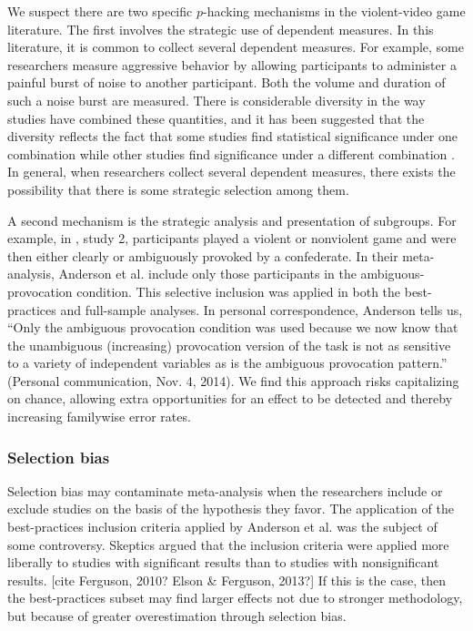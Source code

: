 \documentclass[man]{apa6}
\begin{document}
We suspect there are two specific $p$-hacking mechanisms in the violent-video game literature.  The first involves the strategic use of dependent measures.  In this literature, it is common to collect several dependent measures.  For example, some researchers measure aggressive behavior by allowing participants to administer a painful burst of noise to another participant. Both the volume and duration of such a noise burst are measured.  There is considerable diversity in the way studies have combined these quantities, and it has been suggested that the diversity reflects the fact that some studies find statistical significance under one combination while other studies find significance under a different combination \citep{Elson:etal:2014}.  In general, when researchers collect several dependent measures, there exists the possibility that there is some strategic selection among them.  

A second mechanism is the strategic analysis and presentation of subgroups. For example, in \citet{Anderson:etal:2004}, study 2, participants played a violent or nonviolent game and were then either clearly or ambiguously provoked by a confederate. In their meta-analysis, Anderson et al. include only those participants in the ambiguous-provocation condition. This selective inclusion was applied in both the best-practices and full-sample analyses. In personal correspondence, Anderson tells us, ``Only the ambiguous provocation condition was used because we now know that the unambiguous (increasing) provocation version of the task is not as sensitive to a variety of independent variables as is the ambiguous provocation pattern.'' (Personal communication, Nov. 4, 2014). 
We find this approach risks capitalizing on chance, allowing extra opportunities for an effect to be detected and thereby increasing familywise error rates.

\subsubsection{Selection bias}
Selection bias may contaminate meta-analysis when the researchers include or exclude studies on the basis of the hypothesis they favor. The application of the best-practices inclusion criteria applied by Anderson et al. was the subject of some controversy. Skeptics argued that the inclusion criteria were applied more liberally to studies with significant results than to studies with nonsignificant results. [cite Ferguson, 2010? Elson \& Ferguson, 2013?] If this is the case, then the best-practices subset may find larger effects not due to stronger methodology, but because of greater overestimation through selection bias. 
\end{document}
